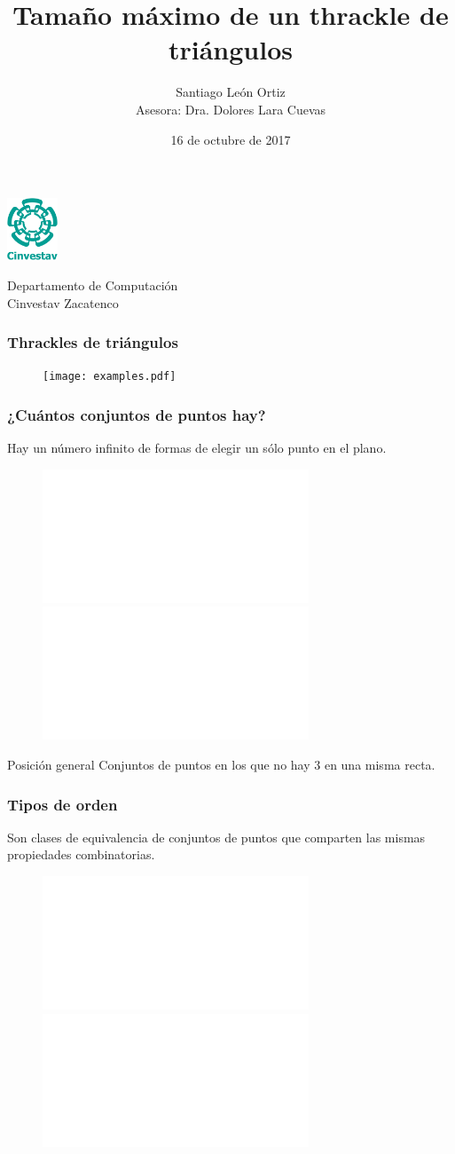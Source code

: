 \documentclass{beamer}
\title{Tamaño máximo de un thrackle de triángulos}
\author [Santiago León O.] {Santiago León Ortiz\\ {\small Asesora: Dra. Dolores Lara Cuevas}}
\institute [Cinvestav, Computación] { }
\date{16 de octubre de 2017}
\begin{document}
\begin{frame}
    \parbox[c]{2cm}{\centering
      \includegraphics[width=1.5cm]{cinvestavlogo.png}
    }
    \parbox[c]{\dimexpr\paperwidth-3cm\relax}{\centering
      {\large Departamento de Computación\\ Cinvestav Zacatenco}
    }
  \maketitle
\end{frame}

\begin{frame}
  \frametitle{Thrackles de triángulos}
  \begin{figure}[htb]
    \texttt{[image: examples.pdf]}
  \end{figure}
\end{frame}

\begin{frame}
  \frametitle{¿Cuántos conjuntos de puntos hay?}
  Hay un número infinito de formas de elegir un sólo punto en el plano.
  \begin{figure}[htb]
    \includegraphics<1>{puntos.pdf}
    \includegraphics<2>{puntos_1.pdf}
  \end{figure}
  \begin{block}{Posición general}
    Conjuntos de puntos en los que no hay 3 en una misma
    recta.
  \end{block}
\end{frame}

\begin{frame}
  \frametitle{Tipos de orden}
  \begin{block}{}
    Son clases de equivalencia de conjuntos de puntos que comparten las mismas
    propiedades combinatorias.
  \end{block}
  \begin{figure}[htb]
    \includegraphics<1>{tipos_de_orden.pdf}
    \includegraphics<2>{tipos_de_orden_1.pdf}
  \end{figure}
\end{frame}
\end{document}
